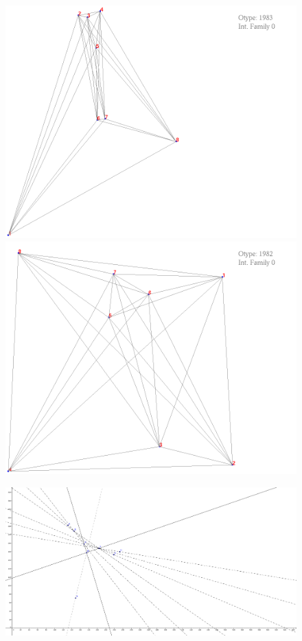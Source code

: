 \documentclass[11pt,epsf,times,letterpaper]{article}
\begin{document}
	\begin{figure}
		\includegraphics[scale=.4]{if_tam0_tam1/27.png}
		\includegraphics[scale=.4]{if_tam0_tam1/28.png}
	\end{figure}
	
	\begin{figure}
		\includegraphics[scale=.35]{maxhalving_lines.png}
	\end{figure}
	
\end{document}

